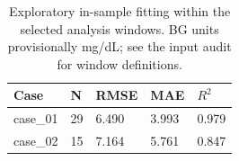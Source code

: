 \begin{table}[htbp]
\centering
\small
\caption{Exploratory in-sample fitting within the selected analysis windows. BG units provisionally mg/dL; see the input audit for window definitions.}
\label{tab:extra-fitting}
\begin{tabular}{lllll}
\toprule
Case & N & RMSE & MAE & $R^2$ \\
\midrule
case\_01 & 29 & 6.490 & 3.993 & 0.979 \\
case\_02 & 15 & 7.164 & 5.761 & 0.847 \\
\bottomrule
\end{tabular}
\end{table}

